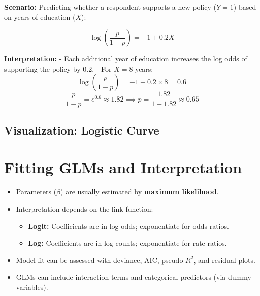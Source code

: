 \documentclass[11pt]{article}
\begin{document}
\textbf{Scenario:} Predicting whether a respondent supports a new policy ($Y=1$) based on years of education ($X$):

\[
\log\left(\frac{p}{1-p}\right) = -1 + 0.2 X
\]

\textbf{Interpretation:}
- Each additional year of education increases the log odds of supporting the policy by 0.2.
- For $X=8$ years:
\[
\log\left(\frac{p}{1-p}\right) = -1 + 0.2 \times 8 = 0.6
\]
\[
\frac{p}{1-p} = e^{0.6} \approx 1.82 \implies p = \frac{1.82}{1+1.82} \approx 0.65
\]

\subsection*{Visualization: Logistic Curve}
\begin{center}
\end{center}

\section{Fitting GLMs and Interpretation}

\begin{itemize}
    \item Parameters ($\beta$) are usually estimated by \textbf{maximum likelihood}.
    \item Interpretation depends on the link function:
        \begin{itemize}
            \item \textbf{Logit:} Coefficients are in log odds; exponentiate for odds ratios.
            \item \textbf{Log:} Coefficients are in log counts; exponentiate for rate ratios.
        \end{itemize}
    \item Model fit can be assessed with deviance, AIC, pseudo-$R^2$, and residual plots.
    \item GLMs can include interaction terms and categorical predictors (via dummy variables).
\end{itemize}
\end{document}
